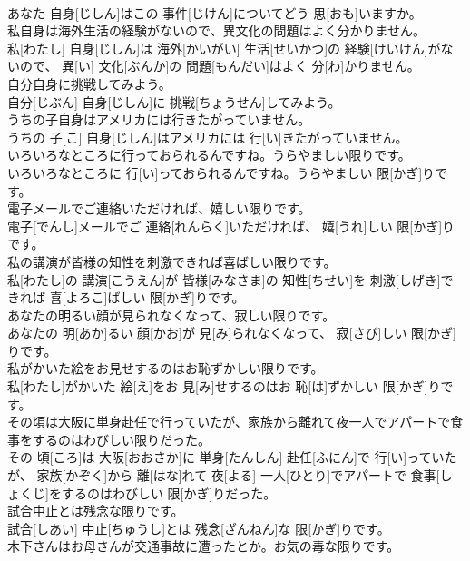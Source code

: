 \documentclass[8pt]{extreport}
\begin{document}
\begin{CJK}{UTF8}{min}
\\	あなた 自身[じしん]はこの 事件[じけん]についてどう 思[おも]いますか。
\\	私自身は海外生活の経験がないので、異文化の問題はよく分かりません。	
\\	私[わたし] 自身[じしん]は 海外[かいがい] 生活[せいかつ]の 経験[けいけん]がないので、 異[い] 文化[ぶんか]の 問題[もんだい]はよく 分[わ]かりません。
\\	自分自身に挑戦してみよう。	
\\	自分[じぶん] 自身[じしん]に 挑戦[ちょうせん]してみよう。
\\	うちの子自身はアメリカには行きたがっていません。	
\\	うちの 子[こ] 自身[じしん]はアメリカには 行[い]きたがっていません。
\\	いろいろなところに行っておられるんですね。うらやましい限りです。	
\\	いろいろなところに 行[い]っておられるんですね。うらやましい 限[かぎ]りです。
\\	電子メールでご連絡いただければ、嬉しい限りです。	
\\	電子[でんし]メールでご 連絡[れんらく]いただければ、 嬉[うれ]しい 限[かぎ]りです。
\\	私の講演が皆様の知性を刺激できれば喜ばしい限りです。	
\\	私[わたし]の 講演[こうえん]が 皆様[みなさま]の 知性[ちせい]を 刺激[しげき]できれば 喜[よろこ]ばしい 限[かぎ]りです。
\\	あなたの明るい顔が見られなくなって、寂しい限りです。	
\\	あなたの 明[あか]るい 顔[かお]が 見[み]られなくなって、 寂[さび]しい 限[かぎ]りです。
\\	私がかいた絵をお見せするのはお恥ずかしい限りです。	
\\	私[わたし]がかいた 絵[え]をお 見[み]せするのはお 恥[は]ずかしい 限[かぎ]りです。
\\	その頃は大阪に単身赴任で行っていたが、家族から離れて夜一人でアパートで食事をするのはわびしい限りだった。	
\\	その 頃[ころ]は 大阪[おおさか]に 単身[たんしん] 赴任[ふにん]で 行[い]っていたが、 家族[かぞく]から 離[はな]れて 夜[よる] 一人[ひとり]でアパートで 食事[しょくじ]をするのはわびしい 限[かぎ]りだった。
\\	試合中止とは残念な限りです。	
\\	試合[しあい] 中止[ちゅうし]とは 残念[ざんねん]な 限[かぎ]りです。
\\	木下さんはお母さんが交通事故に遭ったとか。お気の毒な限りです。	

\end{CJK}
\end{document}
